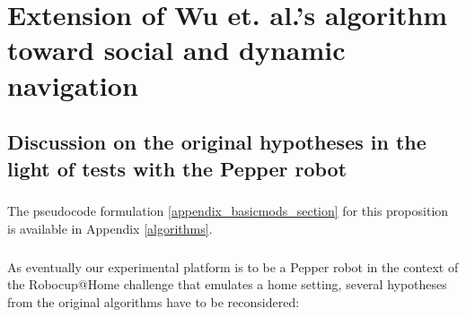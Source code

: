 
\chapter{Extension of Wu et. al.'s algorithm toward social and dynamic navigation} %

\label{Chapter4} %

\section{Discussion on the original hypotheses in the light of tests with the Pepper robot}\label{discussion_hypotheses_section}

\paragraph{} The pseudocode formulation \ref{appendix_basicmods_section} for this proposition is available in Appendix \ref{algorithms}.

\paragraph{} As eventually our experimental platform is to be a Pepper robot in the context of the Robocup@Home challenge that emulates a home setting, several hypotheses from the original algorithms have to be reconsidered:

